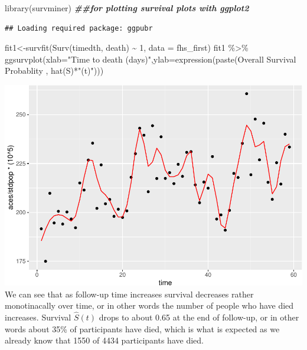 \documentclass[
]{book}
\newenvironment{Shaded}{\begin{snugshade}}{\end{snugshade}}
\newcommand{\AttributeTok}[1]{\textcolor[rgb]{0.77,0.63,0.00}{#1}}
\newcommand{\DecValTok}[1]{\textcolor[rgb]{0.00,0.00,0.81}{#1}}
\newcommand{\DocumentationTok}[1]{\textcolor[rgb]{0.56,0.35,0.01}{\textbf{\textit{#1}}}}
\newcommand{\FunctionTok}[1]{\textcolor[rgb]{0.00,0.00,0.00}{#1}}
\newcommand{\NormalTok}[1]{#1}
\newcommand{\OtherTok}[1]{\textcolor[rgb]{0.56,0.35,0.01}{#1}}
\newcommand{\SpecialCharTok}[1]{\textcolor[rgb]{0.00,0.00,0.00}{#1}}
\newcommand{\StringTok}[1]{\textcolor[rgb]{0.31,0.60,0.02}{#1}}
\begin{document}
\begin{Shaded}
\begin{Highlighting}[]
\FunctionTok{library}\NormalTok{(survminer) }\DocumentationTok{\#\#for plotting survival plots with ggplot2}
\end{Highlighting}
\end{Shaded}

\begin{verbatim}
## Loading required package: ggpubr
\end{verbatim}

\begin{Shaded}
\begin{Highlighting}[]
\NormalTok{fit1}\OtherTok{\textless{}{-}}\FunctionTok{survfit}\NormalTok{(}\FunctionTok{Surv}\NormalTok{(timedth, death) }\SpecialCharTok{\textasciitilde{}} \DecValTok{1}\NormalTok{, }\AttributeTok{data =}\NormalTok{ fhs\_first)}
\NormalTok{fit1 }\SpecialCharTok{\%\textgreater{}\%}
\FunctionTok{ggsurvplot}\NormalTok{(}\AttributeTok{xlab=}\StringTok{"Time to death (days)"}\NormalTok{,}\AttributeTok{ylab=}\FunctionTok{expression}\NormalTok{(}\FunctionTok{paste}\NormalTok{(}\StringTok{\textquotesingle{}Overall Survival Probablity \textquotesingle{}}\NormalTok{, }\FunctionTok{hat}\NormalTok{(S)}\SpecialCharTok{*}\StringTok{"(t)"}\NormalTok{)))}
\end{Highlighting}
\end{Shaded}

\includegraphics{adv_epi_analysis_files/figure-latex/unnamed-chunk-143-1.pdf}
We can see that as follow-up time increases survival decreases rather monotinacally over time, or in other words the number of people who have died increases. Survival \(\hat{S}(t)\) drops to about 0.65 at the end of follow-up, or in other words about 35\% of participants have died, which is what is expected as we already know that 1550 of 4434 participants have died.
\end{document}

